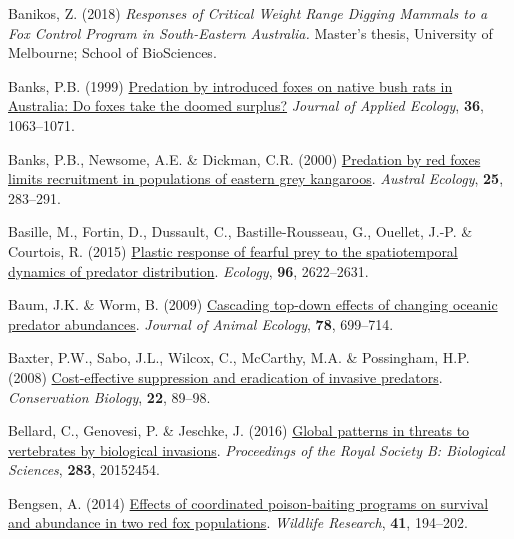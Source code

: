 \documentclass[11pt,a4paper,titlepage,twoside,openright]{style/unimelbthesis}
\newenvironment{CSLReferences}%
  {}%
  {\par}
\begin{document}
\begin{mainmatter}
\begin{CSLReferences}{1}{0}
\leavevmode{}%
Banikos, Z. (2018) \emph{Responses of Critical Weight Range Digging Mammals to a Fox Control Program in South-Eastern {{A}ustralia}.} Master's thesis, University of Melbourne; School of BioSciences.

\leavevmode{}%
Banks, P.B. (1999) \href{https://doi.org/10.1046/j.1365-2664.1999.00463.x}{Predation by introduced foxes on native bush rats in {{A}ustralia}: Do foxes take the doomed surplus?} \emph{Journal of Applied Ecology}, \textbf{36}, 1063--1071.

\leavevmode{}%
Banks, P.B., Newsome, A.E. \& Dickman, C.R. (2000) \href{https://doi.org/10.1046/j.1442-9993.2000.01039.x}{Predation by red foxes limits recruitment in populations of eastern grey kangaroos}. \emph{Austral Ecology}, \textbf{25}, 283--291.

\leavevmode{}%
Basille, M., Fortin, D., Dussault, C., Bastille-Rousseau, G., Ouellet, J.-P. \& Courtois, R. (2015) \href{https://doi.org/10.1890/14-1706.1}{Plastic response of fearful prey to the spatiotemporal dynamics of predator distribution}. \emph{Ecology}, \textbf{96}, 2622--2631.

\leavevmode{}%
Baum, J.K. \& Worm, B. (2009) \href{https://doi.org/10.1111/j.1365-2656.2009.01531.x}{Cascading top-down effects of changing oceanic predator abundances}. \emph{Journal of Animal Ecology}, \textbf{78}, 699--714.

\leavevmode{}%
Baxter, P.W., Sabo, J.L., Wilcox, C., McCarthy, M.A. \& Possingham, H.P. (2008) \href{https://doi.org/10.1111/j.1523-1739.2007.00850.x}{Cost-effective suppression and eradication of invasive predators}. \emph{Conservation Biology}, \textbf{22}, 89--98.

\leavevmode{}%
Bellard, C., Genovesi, P. \& Jeschke, J. (2016) \href{https://doi.org/10.1098/rspb.2015.2454}{Global patterns in threats to vertebrates by biological invasions}. \emph{Proceedings of the Royal Society B: Biological Sciences}, \textbf{283}, 20152454.

\leavevmode{}%
Bengsen, A. (2014) \href{https://doi.org/10.1071/WR13202}{Effects of coordinated poison-baiting programs on survival and abundance in two red fox populations}. \emph{Wildlife Research}, \textbf{41}, 194--202.


\end{CSLReferences}
\end{mainmatter}
\end{document}
